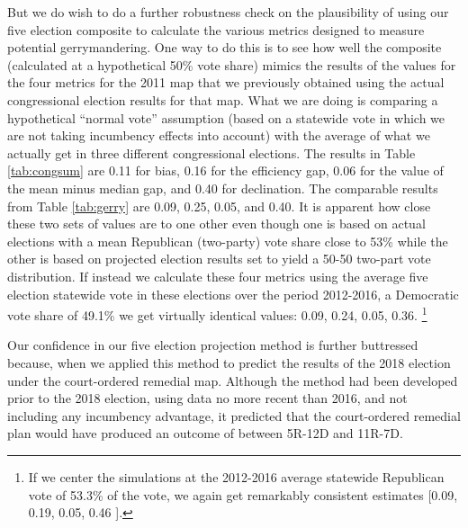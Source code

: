     But we do wish to do a further robustness check on the plausibility of using our five election composite to calculate the various metrics designed to measure potential gerrymandering. One way to do this is to see how well the composite (calculated at a hypothetical 50\% vote share) mimics the results of the values for the four metrics for the 2011 map that we previously obtained using the actual congressional election results for that map. What we are doing is comparing a hypothetical ``normal vote” \citep{Converse1966} assumption (based on a statewide vote in which we are not taking incumbency effects into account) with the average of what we actually get in three different congressional elections. The results in Table \ref{tab:congsum} are 0.11 for bias, 0.16 for the efficiency gap, 0.06 for the value of the mean minus median gap, and 0.40 for declination. The comparable results from Table \ref{tab:gerry} are 0.09, 0.25, 0.05, and 0.40. It is apparent how close these two sets of values are to one other even though one is based on actual elections with a mean Republican (two-party) vote share close to 53\% while the other is based on projected election results set to yield a 50-50 two-part vote distribution. If instead we calculate these four metrics using the average five election statewide vote in these elections over the period 2012-2016, a Democratic vote share of 49.1\% we get virtually identical values: 0.09, 0.24,  0.05, 0.36.
		\footnote{If we center the simulations at the 2012-2016 average statewide Republican vote of 53.3\% of the vote, we again get remarkably consistent estimates [0.09, 0.19, 0.05, 0.46 ].}
\par
    Our confidence in our five election projection method is further buttressed because, when we applied this method to predict the results of the 2018 election under the court-ordered remedial map. Although the method had been developed prior to the 2018 election, using data no more recent than 2016, and not including any incumbency advantage, it predicted that the court-ordered remedial plan would have produced an outcome of between 5R-12D and 11R-7D.
